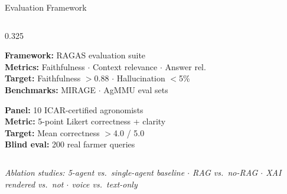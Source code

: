 \documentclass[aspectratio=169, 10pt]{beamer}
\begin{document}
\begin{frame}{Evaluation Framework}
\begin{columns}[T]
    \begin{column}{0.325\textwidth}
      \begin{tcolorbox}[agricard=Purple, title=RAG quality (O4), before skip=0pt, after skip=4pt,
        fonttitle=\bfseries\footnotesize]
        \tiny
        \textbf{Framework:} RAGAS evaluation suite\\
        \textbf{Metrics:} Faithfulness $\cdot$ Context relevance $\cdot$ Answer rel.\\
        \textbf{Target:} Faithfulness $>$0.88 $\cdot$ Hallucination $<$5\%\\
        \textbf{Benchmarks:} MIRAGE $\cdot$ AgMMU eval sets
      \end{tcolorbox}
      \begin{tcolorbox}[agricard=GrayC, title=Expert agronomist panel (O8), before skip=0pt,
        fonttitle=\bfseries\footnotesize]
        \tiny
        \textbf{Panel:} 10 ICAR-certified agronomists\\
        \textbf{Metric:} 5-point Likert correctness + clarity\\
        \textbf{Target:} Mean correctness $>$4.0 / 5.0\\
        \textbf{Blind eval:} 200 real farmer queries
      \end{tcolorbox}
    \end{column}
  \end{columns}

  \vspace{3pt}
  {\footnotesize\color{Muted}\itshape Ablation studies: 5-agent vs.\ single-agent baseline $\cdot$ RAG vs.\ no-RAG $\cdot$ XAI rendered vs.\ not $\cdot$ voice vs.\ text-only}
\end{frame}
\end{document}
